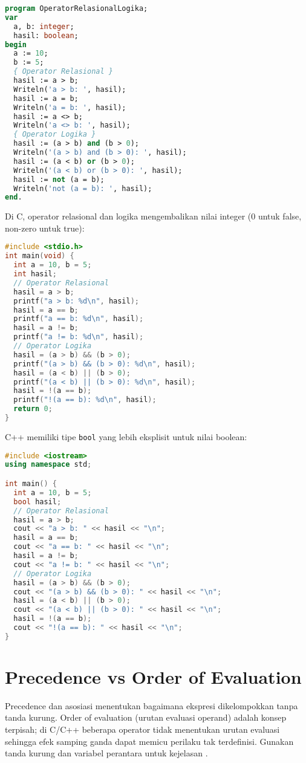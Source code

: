 \documentclass[../main.tex]{subfiles}
\begin{document}
\begin{lstlisting}[language=Pascal, caption={Operator relasional dan logika di Pascal}]
program OperatorRelasionalLogika;
var
  a, b: integer;
  hasil: boolean;
begin
  a := 10;
  b := 5;
  { Operator Relasional }
  hasil := a > b;
  Writeln('a > b: ', hasil);
  hasil := a = b;
  Writeln('a = b: ', hasil);
  hasil := a <> b;
  Writeln('a <> b: ', hasil);
  { Operator Logika }
  hasil := (a > b) and (b > 0);
  Writeln('(a > b) and (b > 0): ', hasil);
  hasil := (a < b) or (b > 0);
  Writeln('(a < b) or (b > 0): ', hasil);
  hasil := not (a = b);
  Writeln('not (a = b): ', hasil);
end.
\end{lstlisting}

Di C, operator relasional dan logika mengembalikan nilai integer (0 untuk false, non-zero untuk true):

\begin{lstlisting}[language=C, caption={Operator relasional dan logika di C}]
#include <stdio.h>
int main(void) {
  int a = 10, b = 5;
  int hasil;
  // Operator Relasional
  hasil = a > b;
  printf("a > b: %d\n", hasil);
  hasil = a == b;
  printf("a == b: %d\n", hasil);
  hasil = a != b;
  printf("a != b: %d\n", hasil);
  // Operator Logika
  hasil = (a > b) && (b > 0);
  printf("(a > b) && (b > 0): %d\n", hasil);
  hasil = (a < b) || (b > 0);
  printf("(a < b) || (b > 0): %d\n", hasil);
  hasil = !(a == b);
  printf("!(a == b): %d\n", hasil);
  return 0;
}
\end{lstlisting}

C++ memiliki tipe \texttt{bool} yang lebih eksplisit untuk nilai boolean:

\begin{lstlisting}[language=C++, caption={Operator relasional dan logika di C++}]
#include <iostream>
using namespace std;

int main() {
  int a = 10, b = 5;
  bool hasil;
  // Operator Relasional
  hasil = a > b;
  cout << "a > b: " << hasil << "\n";
  hasil = a == b;
  cout << "a == b: " << hasil << "\n";
  hasil = a != b;
  cout << "a != b: " << hasil << "\n";
  // Operator Logika
  hasil = (a > b) && (b > 0);
  cout << "(a > b) && (b > 0): " << hasil << "\n";
  hasil = (a < b) || (b > 0);
  cout << "(a < b) || (b > 0): " << hasil << "\n";
  hasil = !(a == b);
  cout << "!(a == b): " << hasil << "\n";
}
\end{lstlisting}

\section{Precedence vs Order of Evaluation}
Precedence dan asosiasi menentukan bagaimana ekspresi dikelompokkan tanpa tanda kurung. Order of evaluation (urutan evaluasi operand) adalah konsep terpisah; di C/C++ beberapa operator tidak menentukan urutan evaluasi sehingga efek samping ganda dapat memicu perilaku tak terdefinisi. Gunakan tanda kurung dan variabel perantara untuk kejelasan \parencite{gnu-c-manual,cpp-op-precedence,c-op-precedence,c-order-of-eval,cpp-order-of-eval}.
\end{document}
